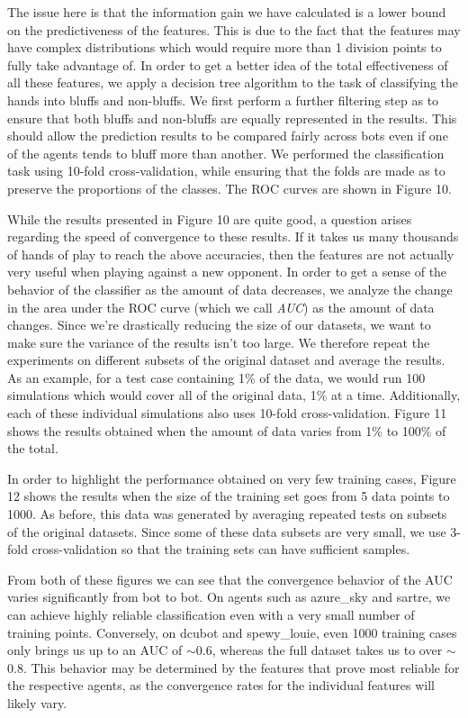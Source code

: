 \documentclass[letterpaper]{article}
\begin{document}
The issue here is that the information gain we have calculated is a lower bound on the predictiveness of the features. This is due to the fact that the features may have complex distributions which would require more than 1 division points to fully take advantage of. In order to get a better idea of the total effectiveness of all these features, we apply a decision tree algorithm to the task of classifying the hands into bluffs and non-bluffs. We first perform a further filtering step as to ensure that both bluffs and non-bluffs are equally represented in the results. This should allow the prediction results to be compared fairly across bots even if one of the agents tends to bluff more than another. We performed the classification task using 10-fold cross-validation, while ensuring that the folds are made as to preserve the proportions of the classes. The ROC curves are shown in Figure 10.

While the results presented in Figure 10 are quite good, a question arises regarding the speed of convergence to these results. If it takes us many thousands of hands of play to reach the above accuracies, then the features are not actually very useful when playing against a new opponent. In order to get a sense of the behavior of the classifier as the amount of data decreases, we analyze the change in the area under the ROC curve (which we call \emph{AUC}) as the amount of data changes. Since we're drastically reducing the size of our datasets, we want to make sure the variance of the results isn't too large. We therefore repeat the experiments on different subsets of the original dataset and average the results. As an example, for a test case containing 1\% of the data, we would run 100 simulations which would cover all of the original data, 1\% at a time. Additionally, each of these individual simulations also uses 10-fold cross-validation. Figure 11 shows the results obtained when the amount of data varies from 1\% to 100\% of the total. 

In order to highlight the performance obtained on very few training cases, Figure 12 shows the results when the size of the training set goes from 5 data points to 1000. As before, this data was generated by averaging repeated tests on subsets of the original datasets. Since some of these data subsets are very small, we use 3-fold cross-validation so that the training sets can have sufficient samples.

From both of these figures we can see that the convergence behavior of the AUC varies significantly from bot to bot. On agents such as azure\_sky and sartre, we can achieve highly reliable classification even with a very small number of training points. Conversely, on dcubot and spewy\_louie, even 1000 training cases only brings us up to an AUC of $\sim$0.6, whereas the full dataset takes us to over $\sim$0.8. This behavior may be determined by the features that prove most reliable for the respective agents, as the convergence rates for the individual features will likely vary.
\end{document}
